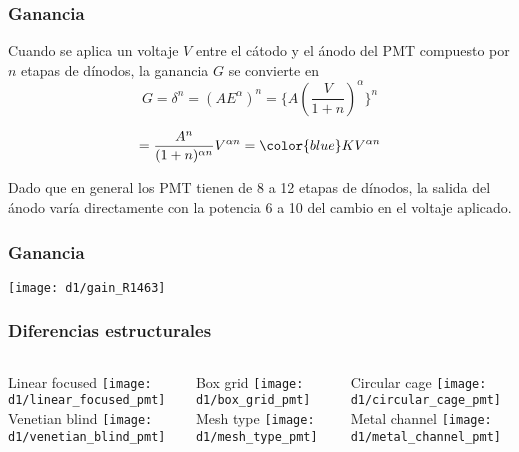\documentclass{beamer}
\begin{document}
\begin{frame}
\frametitle{Ganancia}
Cuando se aplica un voltaje $V$ entre el cátodo y el ánodo del PMT compuesto por
$n$ etapas de dínodos, la ganancia $G$ se convierte en
$$G = \delta^n = \left(A E^\alpha \right)^n = \bigg\{A \left(\frac{V}{1 +
n}\right)^\alpha \bigg\}^n{}$$

$$ = \frac{A^n}{(1 + n)^{\alpha n}} V^{\alpha n} = {\color{blue}K V^{\alpha n}}$$

\begin{alertblock}{}
Dado que en general los PMT tienen de 8 a 12 etapas
de dínodos, la salida del ánodo varía directamente con la
potencia 6 a 10 del cambio en el voltaje aplicado.
\end{alertblock}
\end{frame} 

\begin{frame}
\frametitle{Ganancia}
\begin{center}
\texttt{[image: d1/gain\_R1463]}
\end{center}
\end{frame}

\begin{frame}
\frametitle{Diferencias estructurales}
\begin{columns}
\begin{column}{0.3\textwidth}
\begin{center}
{\color{blue}Linear focused}
\texttt{[image: d1/linear\_focused\_pmt]} \\
{\color{blue}Venetian blind}
\texttt{[image: d1/venetian\_blind\_pmt]}
\end{center}
\end{column}
\begin{column}{0.3\textwidth}
\begin{center}
{\color{blue}Box grid}
\texttt{[image: d1/box\_grid\_pmt]} \\
{\color{blue}Mesh type}
\texttt{[image: d1/mesh\_type\_pmt]}
\end{center}
\end{column}
\begin{column}{0.3\textwidth}
\begin{center}
{\color{blue}Circular cage}
\texttt{[image: d1/circular\_cage\_pmt]} \\ 
{\color{blue}Metal channel}
\texttt{[image: d1/metal\_channel\_pmt]}
\end{center}
\end{column}
\end{columns}
\end{frame}
\end{document}
